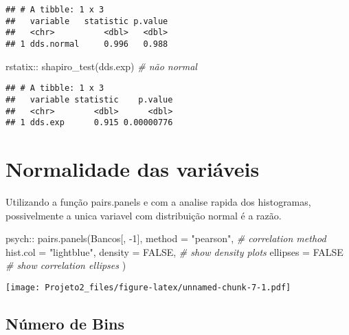 \documentclass[
]{article}
\newenvironment{Shaded}{\begin{snugshade}}{\end{snugshade}}
\newcommand{\AttributeTok}[1]{\textcolor[rgb]{0.77,0.63,0.00}{#1}}
\newcommand{\CommentTok}[1]{\textcolor[rgb]{0.56,0.35,0.01}{\textit{#1}}}
\newcommand{\ConstantTok}[1]{\textcolor[rgb]{0.00,0.00,0.00}{#1}}
\newcommand{\DecValTok}[1]{\textcolor[rgb]{0.00,0.00,0.81}{#1}}
\newcommand{\FunctionTok}[1]{\textcolor[rgb]{0.00,0.00,0.00}{#1}}
\newcommand{\NormalTok}[1]{#1}
\newcommand{\SpecialCharTok}[1]{\textcolor[rgb]{0.00,0.00,0.00}{#1}}
\newcommand{\StringTok}[1]{\textcolor[rgb]{0.31,0.60,0.02}{#1}}
\begin{document}
\begin{verbatim}
## # A tibble: 1 x 3
##   variable   statistic p.value
##   <chr>          <dbl>   <dbl>
## 1 dds.normal     0.996   0.988
\end{verbatim}

\begin{Shaded}
\begin{Highlighting}[]
\NormalTok{rstatix}\SpecialCharTok{::} \FunctionTok{shapiro\_test}\NormalTok{(dds.exp) }\CommentTok{\# não normal}
\end{Highlighting}
\end{Shaded}

\begin{verbatim}
## # A tibble: 1 x 3
##   variable statistic    p.value
##   <chr>        <dbl>      <dbl>
## 1 dds.exp      0.915 0.00000776
\end{verbatim}

\hypertarget{normalidade-das-variuxe1veis}{%
\section{Normalidade das variáveis}\label{normalidade-das-variuxe1veis}}

Utilizando a função pairs.panels e com a analise rapida dos histogramas,
possivelmente a unica variavel com distribuição normal é a razão.

\begin{Shaded}
\begin{Highlighting}[]
\NormalTok{psych}\SpecialCharTok{::} \FunctionTok{pairs.panels}\NormalTok{(Bancos[, }\SpecialCharTok{{-}}\DecValTok{1}\NormalTok{], }
             \AttributeTok{method =} \StringTok{"pearson"}\NormalTok{, }\CommentTok{\# correlation method}
             \AttributeTok{hist.col =} \StringTok{"lightblue"}\NormalTok{,}
            \AttributeTok{density =} \ConstantTok{FALSE}\NormalTok{,  }\CommentTok{\# show density plots}
             \AttributeTok{ellipses =} \ConstantTok{FALSE} \CommentTok{\# show correlation ellipses}
\NormalTok{             )}
\end{Highlighting}
\end{Shaded}

\texttt{[image: Projeto2\_files/figure-latex/unnamed-chunk-7-1.pdf]}

\hypertarget{nuxfamero-de-bins}{%
\subsection{Número de Bins}\label{nuxfamero-de-bins}}
\end{document}
